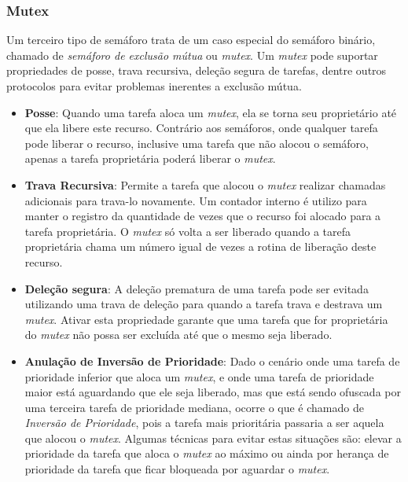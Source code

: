 

\subsubsection{Mutex}

Um terceiro tipo de semáforo trata de um caso especial do semáforo binário, chamado de \emph{semáforo de exclusão mútua} ou \emph{mutex}.  Um \emph{mutex} pode suportar propriedades de posse, trava recursiva, deleção segura de tarefas, dentre outros protocolos para evitar problemas inerentes a exclusão mútua.

\begin{itemize}
	\item \textbf{Posse}: Quando uma tarefa aloca um \emph{mutex}, ela se torna seu proprietário até que ela libere este recurso. Contrário aos semáforos, onde qualquer tarefa pode liberar o recurso, inclusive uma tarefa que não alocou o semáforo, apenas a tarefa proprietária poderá liberar o \emph{mutex}.
	\item \textbf{Trava Recursiva}: Permite a tarefa que alocou o \emph{mutex} realizar chamadas adicionais para trava-lo novamente. Um contador interno é utilizo para manter o registro da quantidade de vezes que o recurso foi alocado para a tarefa proprietária. O \emph{mutex} só volta a ser liberado quando a tarefa proprietária chama um número igual de vezes a rotina de liberação deste recurso.
	\item \textbf{Deleção segura}: A deleção prematura de uma tarefa pode ser evitada utilizando uma trava de deleção para quando a tarefa trava e destrava um \emph{mutex}. Ativar esta propriedade garante que uma tarefa que for proprietária do \emph{mutex} não possa ser excluída até que o mesmo seja liberado.
	\item \textbf{Anulação de Inversão de Prioridade}: Dado o cenário onde uma tarefa de prioridade inferior que aloca um \emph{mutex}, e onde uma tarefa de prioridade maior está aguardando que ele seja liberado, mas que está sendo ofuscada por uma terceira tarefa de prioridade mediana, ocorre o que é chamado de \emph{Inversão de Prioridade}, pois a tarefa mais prioritária passaria a ser aquela que alocou o \emph{mutex}. Algumas técnicas para evitar estas situações são: elevar a prioridade da tarefa que aloca o \emph{mutex} ao máximo ou ainda por herança de prioridade da tarefa que ficar bloqueada por aguardar o \emph{mutex}.
\end{itemize}

